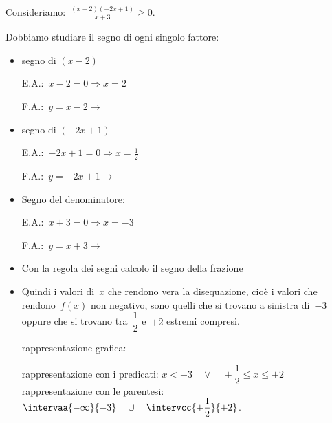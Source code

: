  \begin{esempio}{}{}
Consideriamo:~\(\frac{(x-2)(-2x+1)}{x+3} \ge 0\).

Dobbiamo studiare il segno di ogni singolo fattore:
\begin{itemize} [noitemsep]
 \item segno di \((x-2)\)\\
 \begin{minipage}{.45\textwidth}
  E.A.:~\(x-2=0 \Rightarrow x=2\)
 \end{minipage}
 \begin{minipage}{.25\textwidth}
  F.A.:~\(y=x-2 \rightarrow \)
 \end{minipage}
 \begin{minipage}{.3\textwidth}
 \end{minipage}
 \item segno di \((-2x+1)\)\\
 \begin{minipage}{.45\textwidth}
  E.A.:~\(-2x+1=0 \Rightarrow x=\frac{1}{2}\)
 \end{minipage}
 \begin{minipage}{.25\textwidth}
  F.A.:~\(y=-2x+1 \rightarrow \)
 \end{minipage}
 \begin{minipage}{.3\textwidth}
 \end{minipage}
 \item Segno del denominatore:\\
 \begin{minipage}{.45\textwidth}
  E.A.:~\(x + 3=0 \Rightarrow x=-3\)
 \end{minipage}
 \begin{minipage}{.25\textwidth}
  F.A.:~\(y=x +3 \rightarrow \)
 \end{minipage}
 \begin{minipage}{.3\textwidth}
 \end{minipage}
 \item Con la regola dei segni calcolo il segno della frazione 

   \segnomistadisa
 \item Quindi i valori di~\(x\) che rendono vera la disequazione, cioè i 
valori
  che rendono~\(f(x)\) non negativo, sono quelli 
  che si trovano a sinistra di~\(-3\) oppure che si trovano 
  tra~\(\dfrac{1}{2}\) e~\(+2\) estremi compresi. 
 \subitem 
  \begin{minipage}{.35\textwidth}
   rappresentazione grafica: 
  \end{minipage}
  \begin{minipage}{.30\textwidth}
  \end{minipage}
 \subitem rappresentazione con i 
   predicati: \quad \(x < -3 \quad \vee \quad 
                      +\dfrac{1}{2} \le x \le +2\) 
 \subitem rappresentazione con le 
  parentesi:\quad \(\intervaa{-\infty}{-3} \quad \cup \quad 
                    \intervcc{+\dfrac{1}{2}}{+2}\). 
\end{itemize}
 \end{esempio}

